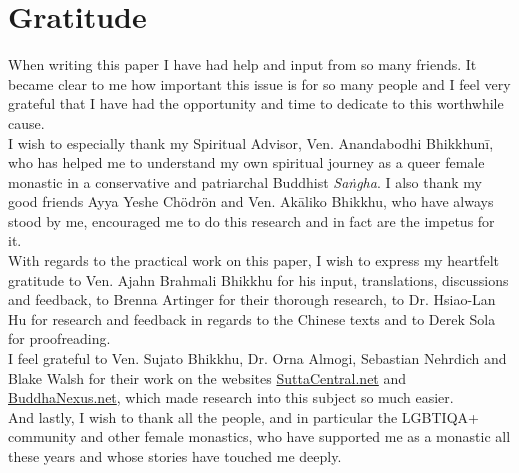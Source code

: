 \section{Gratitude}

When writing this paper I have had help and input from so many friends. It became clear to me how important this issue is for so many people and I feel very grateful that I have had the opportunity and time to dedicate to this worthwhile cause.\\

I wish to especially thank my Spiritual Advisor, Ven. Anandabodhi Bhikkhunī, who has helped me to understand my own spiritual journey as a queer female monastic in a conservative and patriarchal Buddhist {\em Saṅgha}. I also thank my good friends Ayya Yeshe Chödrön and Ven. Akāliko Bhikkhu, who have always stood by me, encouraged me to do this research and in fact are the impetus for it.\\

With regards to the practical work on this paper, I wish to express my heartfelt gratitude to Ven. Ajahn Brahmali Bhikkhu for his input, translations, discussions and feedback, to Brenna Artinger for their thorough research, to Dr. Hsiao-Lan Hu for research and feedback in regards to the Chinese texts and to Derek Sola for proofreading.\\

I feel grateful to Ven. Sujato Bhikkhu, Dr. Orna Almogi, Sebastian Nehrdich and Blake Walsh for their work on the websites \href{https://suttacentral.net/}{SuttaCentral.net} and \href{https://buddhanexus.net/}{BuddhaNexus.net}, which made research into this subject so much easier.\\

And lastly, I wish to thank all the people, and in particular the LGBTIQA+ community and other female monastics, who have supported me as a monastic all these years and whose stories have touched me deeply.

